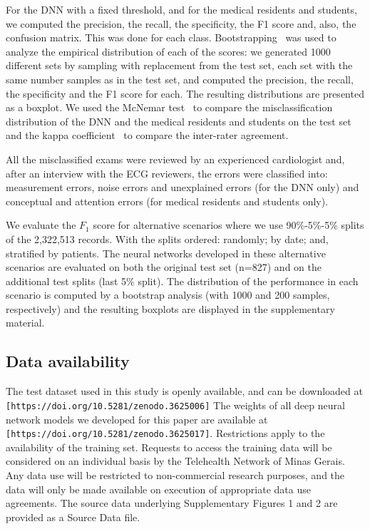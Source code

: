 \documentclass{article}
\begin{document}
For the DNN with a fixed threshold, and for the medical residents and students, we computed the precision, the recall, the specificity, the F1 score and, also, the confusion matrix. This was done for each class. Bootstrapping~\cite{efron_introduction_1994} was used to analyze the empirical distribution of each of the scores: we generated 1000 different sets by sampling  with replacement from the test set, each set with the same number samples as in the test set, and computed the precision, the recall, the specificity and the F1 score for each. The resulting distributions are presented as a boxplot. We used the McNemar test~\cite{mcnemar_note_1947} to compare the misclassification distribution of the DNN and the medical residents and students on the test set and the kappa coefficient~\cite{cohen_coefficient_1960} to compare the inter-rater agreement.

All the misclassified exams were reviewed by an experienced cardiologist and, after an interview with the ECG reviewers, the errors were classified into: measurement errors, noise errors and unexplained errors (for the DNN only) and conceptual and attention errors (for medical residents and students only).


We evaluate the $F_1$ score for alternative scenarios where we use 90\%-5\%-5\% splits of the 2,322,513 records. With the splits ordered: randomly; by date; and, stratified by patients. The neural networks developed in these alternative scenarios are evaluated on both the original test set (n=827) and on the additional test splits (last 5\% split).  The distribution of the performance in each scenario is computed by a bootstrap analysis (with 1000 and 200 samples, respectively) and the resulting boxplots are displayed in the supplementary material.

\subsection*{Data availability} The test dataset used in this study is openly available, and can be downloaded at\\ 
\verb|[https://doi.org/10.5281/zenodo.3625006]| The weights of all deep neural network models we developed for this paper are  available at \verb|[https://doi.org/10.5281/zenodo.3625017]|. Restrictions apply to the availability of the training set. Requests to access the training data will be considered on an individual basis by the Telehealth Network of Minas Gerais. Any data use will be restricted to non-commercial research purposes, and the data will only be made available on execution of appropriate data use agreements. The source data underlying Supplementary Figures 1 and 2 are provided as a Source Data file.
\end{document}
